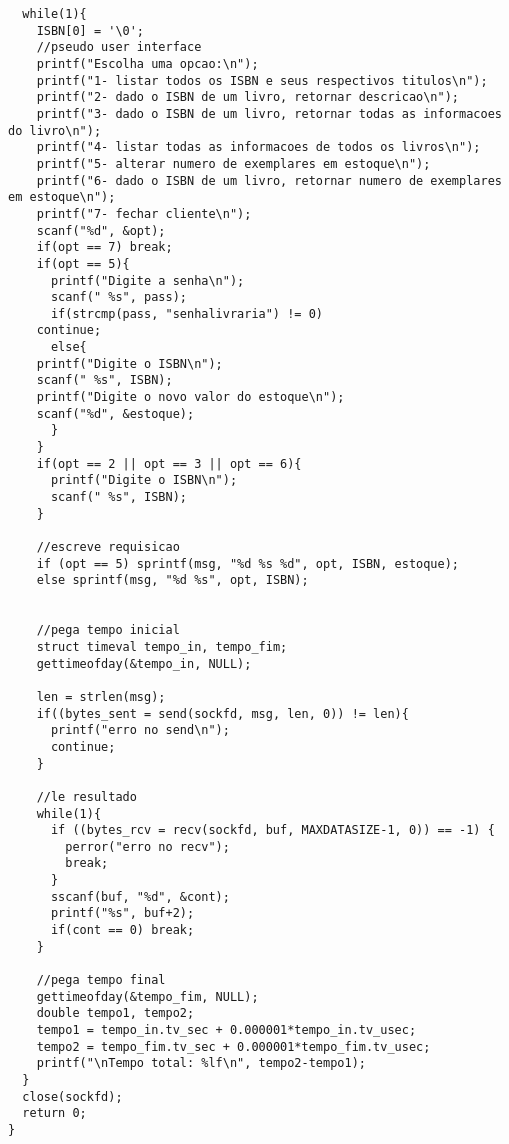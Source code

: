 \documentclass[11pt, brazil]{article} %
\begin{document}
\begin{verbatim}
  while(1){
    ISBN[0] = '\0';
    //pseudo user interface
    printf("Escolha uma opcao:\n");
    printf("1- listar todos os ISBN e seus respectivos titulos\n");
    printf("2- dado o ISBN de um livro, retornar descricao\n");
    printf("3- dado o ISBN de um livro, retornar todas as informacoes do livro\n");
    printf("4- listar todas as informacoes de todos os livros\n");
    printf("5- alterar numero de exemplares em estoque\n");
    printf("6- dado o ISBN de um livro, retornar numero de exemplares em estoque\n");
    printf("7- fechar cliente\n");
    scanf("%d", &opt);
    if(opt == 7) break;
    if(opt == 5){
      printf("Digite a senha\n");
      scanf(" %s", pass);
      if(strcmp(pass, "senhalivraria") != 0)
	continue;
      else{
	printf("Digite o ISBN\n");
	scanf(" %s", ISBN);
	printf("Digite o novo valor do estoque\n");
	scanf("%d", &estoque);
      }
    }
    if(opt == 2 || opt == 3 || opt == 6){
      printf("Digite o ISBN\n");
      scanf(" %s", ISBN);
    }
		
    //escreve requisicao
    if (opt == 5) sprintf(msg, "%d %s %d", opt, ISBN, estoque);
    else sprintf(msg, "%d %s", opt, ISBN);  
		
		
    //pega tempo inicial
    struct timeval tempo_in, tempo_fim;
    gettimeofday(&tempo_in, NULL);
		
    len = strlen(msg);
    if((bytes_sent = send(sockfd, msg, len, 0)) != len){
      printf("erro no send\n");
      continue;	
    }
	
    //le resultado
    while(1){
      if ((bytes_rcv = recv(sockfd, buf, MAXDATASIZE-1, 0)) == -1) {
        perror("erro no recv");
        break;
      }
      sscanf(buf, "%d", &cont);    		    
      printf("%s", buf+2);
      if(cont == 0) break;
    }
		
    //pega tempo final
    gettimeofday(&tempo_fim, NULL);
    double tempo1, tempo2;
    tempo1 = tempo_in.tv_sec + 0.000001*tempo_in.tv_usec;
    tempo2 = tempo_fim.tv_sec + 0.000001*tempo_fim.tv_usec;
    printf("\nTempo total: %lf\n", tempo2-tempo1);
  }
  close(sockfd);
  return 0;
}
\end{verbatim}
\end{document}
